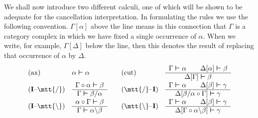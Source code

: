 We shall now introduce two different calculi, one of which will
be shown to be adequate for the cancellation interpretation. In 
formulating the rules we use the following convention. $\Gamma[\alpha]$ 
above the line means in this connection that $\Gamma$ is a
category complex in which we have fixed a single occurrence of 
$\alpha$. When we write, for example, $\Gamma[\Delta]$ below the line,
then this denotes the result of replacing that occurrence
of $\alpha$ by $\Delta$.
\begin{equation}
\begin{array}{l@{\quad}l@{\qquad}l@{\quad}l}
\mbox{\rm (ax)} & \alpha \bvdash \alpha &
\mbox{\rm (cut)} & \begin{array}{c}
                \Gamma \bvdash \alpha \qquad \Delta[\alpha] \bvdash \beta
                        \\\hline
                    \Delta[\Gamma]  \bvdash \beta
                \end{array} \\
\mbox{\rm (\textbf{I}--{\mtt{\tf}})} & \begin{array}{c}
                \Gamma \circ \alpha \bvdash \beta \\\hline
                \Gamma \bvdash \beta/\alpha
              \end{array} 
	      	&
\mbox{\rm ({\mtt{\tf}}--\textbf{I})} & \begin{array}{c}
        \Gamma \bvdash \alpha \qquad \Delta[\beta] \bvdash \gamma \\\hline
            \Delta[\beta/\alpha \circ \Gamma] \bvdash \gamma
              \end{array} \\
\mbox{\rm (\textbf{I}--{\mtt{\tb}})} & \begin{array}{c}
                \alpha \circ \Gamma \bvdash \beta \\\hline
                \Gamma \bvdash \alpha \backslash \beta
                \end{array} 
		& 
\mbox{\rm ({\mtt{\tb}}--\textbf{I})} & \begin{array}{c}
        \Gamma \bvdash \alpha \qquad \Delta[\beta] \bvdash \gamma \\\hline
            \Delta[\Gamma \circ \alpha \backslash \beta] \bvdash \gamma
                \end{array}
\end{array}
\end{equation}
